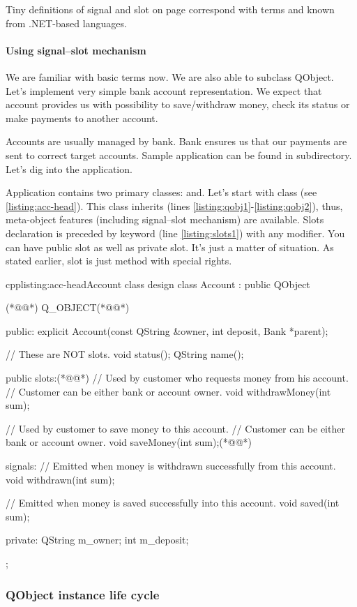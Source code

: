 \begin{fdocextra}
Tiny definitions of signal and slot on page \pageref{desc:sig} correspond with terms  and  known from .NET-based languages. \citep[p.~200-202]{nigel:csharp}
\end{fdocextra}

\paragraph{Using signal--slot mechanism}
We are familiar with basic terms now. We are also able to subclass QObject. Let's implement very simple bank account representation. We expect that account provides us with possibility to save/withdraw money, check its status or make payments to another account.

Accounts are usually managed by bank. Bank ensures us that our payments are sent to correct target accounts. Sample application can be found in subdirectory. Let's dig into the application.

Application contains two primary classes: and. Let's start with class (see \autoref{listing:acc-head}). This class inherits (lines \ref{listing:qobj1}-\ref{listing:qobj2}), thus, meta-object features (including signal--slot mechanism) are available. Slots declaration is preceded by keyword (line \ref{listing:slots1}) with any modifier. You can have public slot as well as private slot. It's just a matter of situation. As stated earlier, slot is just method with special rights.

\begin{fdoccode}{cpp}{listing:acc-head}{Account class design}
class Account : public QObject {(*@\label{listing:qobj1}@*)
	Q_OBJECT(*@\label{listing:qobj2}@*)

    public:
		explicit Account(const QString &owner,
						int deposit,
						Bank *parent);

		// These are NOT slots.
		void status();
		QString name();

    public slots:(*@\label{listing:slots1}@*)
		// Used by customer who requests money from his account.
		// Customer can be either bank or account owner.
		void withdrawMoney(int sum);

		// Used by customer to save money to this account.
		// Customer can be either bank or account owner.
		void saveMoney(int sum);(*@\label{listing:slots2}@*)

    signals:
		// Emitted when money is withdrawn successfully from this account.
		void withdrawn(int sum);

		// Emitted when money is saved successfully into this account.
		void saved(int sum);

    private:
		QString m_owner;
		int m_deposit;
};
\end{fdoccode}

\subsubsection{QObject instance life cycle}
